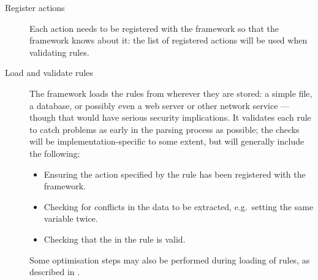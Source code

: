 \begin{description}

    \item [Register actions]  Each action needs to be registered with the
        framework so that the framework knows about it: the list of
        registered actions will be used when validating rules.

    \item [Load and validate rules]  The framework loads the rules from
        wherever they are stored: a simple file, a database, or possibly
        even a web server or other network service --- though that would
        have serious security implications.  It validates each rule to
        catch problems as early in the parsing process as possible; the
        checks will be implementation-specific to some extent, but will
        generally include the following:

        \begin{itemize}

            \squeezeitems{}

            \item Ensuring the action specified by the rule has been
                registered with the framework.

            \item Checking for conflicts in the data to be extracted, e.g.\
                setting the same variable twice.

            \item Checking that the  in the rule is valid.

        \end{itemize}

        Some optimisation steps may also be performed during loading of
        rules, as described in \sectionref{parser efficiency}.


\end{description}

